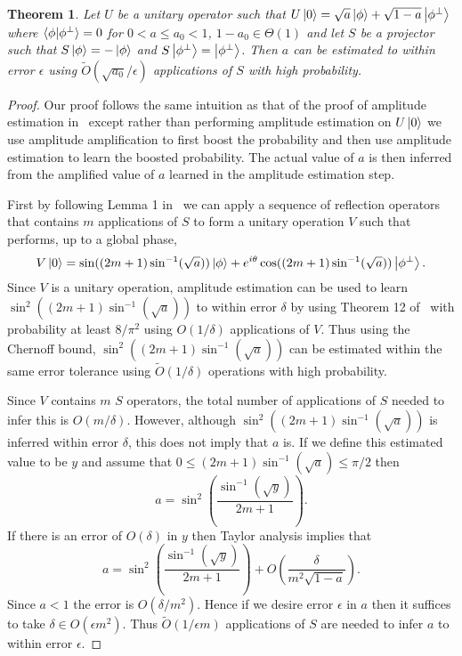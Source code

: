\documentclass[aps,amsmath,onecolumn,amssymb,notitlepage]{revtex4-1}
\newtheorem{theorem}{Theorem}
\begin{document}
\begin{theorem}
Let $U$ be a unitary operator such that $U\left|0\right\rangle=\sqrt{a}\left|\phi\right\rangle + \sqrt{1-a}\left|\phi^\perp\right\rangle$ where $\langle\phi|\phi^\perp\rangle=0$ for $0<a\le a_0<1$, $1-a_0\in \Theta(1)$ and let $S$ be a projector such that $S\left|\phi\right\rangle=-\left|\phi\right\rangle$ and $S\left|\phi^\perp\right\rangle=\left|\phi^\perp\right\rangle$.  Then $a$ can be estimated to within error $\epsilon$ using $\tilde{O}(\sqrt{a_0}/\epsilon)$ applications of $S$ with high probability.\label{thm:priorAmpEst}
\end{theorem}
\begin{proof}
Our proof follows the same intuition as that of the proof of amplitude estimation in~\cite{BHM+02} except rather than performing amplitude estimation on $U\left|0\right\rangle$ we use amplitude amplification to first boost the probability and then use amplitude estimation to learn the boosted probability.  The actual value of $a$ is then inferred from the amplified value of $a$ learned in the amplitude estimation step.

First by following Lemma 1 in~\cite{BHM+02} we can apply a sequence of reflection operators that contains $m$ applications of $S$ to form a unitary operation $V$ such that performs, up to a global phase,
\begin{equation}
V\left|0\right\rangle = \sin((2m+1)\sin^{-1}(\sqrt{a}))\left|\phi\right\rangle + e^{i\theta}\cos((2m+1)\sin^{-1}(\sqrt{a}))\left|\phi^\perp\right\rangle.
\end{equation}
Since $V$ is a unitary operation, amplitude estimation can be used to learn $\sin^2((2m+1)\sin^{-1}(\sqrt{a}))$ to within error $\delta$ by using Theorem 12 of~\cite{BHM+02} with probability at least $8/\pi^2$ using $O(1/\delta)$ applications of $V$.  Thus using the Chernoff bound, $\sin^2((2m+1)\sin^{-1}(\sqrt{a}))$ can be estimated within the same error tolerance using $\tilde{O}(1/\delta)$ operations with high probability.

Since $V$ contains $m$ $S$ operators, the total number of applications of $S$ needed to infer this is $O(m/\delta)$.  However, although $\sin^2((2m+1)\sin^{-1}(\sqrt{a}))$ is inferred within error $\delta$, this does not imply that $a$ is.  If we define this estimated value to be $y$ and assume that $0\le (2m+1)\sin^{-1}(\sqrt{a}) \le \pi/2$ then
\begin{equation}
a = \sin^2\left(\frac{\sin^{-1}(\sqrt{y})}{2m+1}\right).\label{eq:aeq}
\end{equation}
If there is an error of $O(\delta)$ in $y$ then Taylor analysis implies that
\begin{equation}
a=\sin^2\left(\frac{\sin^{-1}(\sqrt{y})}{2m+1}\right) + O\left(\frac{\delta}{m^2\sqrt{1-a}} \right).
\end{equation}
Since $a<1$ the error is $O(\delta/m^2)$.  Hence if we desire error $\epsilon$ in $a$ then it suffices to take $\delta\in O(\epsilon m^2)$.  Thus $\tilde O(1/\epsilon m)$ applications of $S$ are needed to infer $a$ to within error $\epsilon$.


\end{proof}
\end{document}
